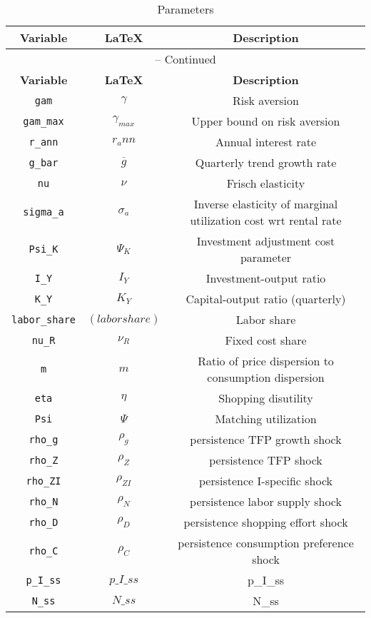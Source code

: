 \begin{center}
\begin{longtable}{ccc}
\caption{Parameters}\\%
\hline%
\multicolumn{1}{c}{\textbf{Variable}} &
\multicolumn{1}{c}{\textbf{\LaTeX}} &
\multicolumn{1}{c}{\textbf{Description}}\\%
\hline\hline%
\endfirsthead
\multicolumn{3}{c}{{\tablename} \thetable{} -- Continued}\\%
\hline%
\multicolumn{1}{c}{\textbf{Variable}} &
\multicolumn{1}{c}{\textbf{\LaTeX}} &
\multicolumn{1}{c}{\textbf{Description}}\\%
\hline\hline%
\endhead
\texttt{gam} & ${\gamma}$ & Risk aversion\\
\texttt{gam\_max} & ${\gamma_{max}}$ & Upper bound on risk aversion\\
\texttt{r\_ann} & ${r_ann}$ & Annual interest rate\\
\texttt{g\_bar} & ${\overline{g}}$ & Quarterly trend growth rate\\
\texttt{nu} & $\nu$ & Frisch elasticity\\
\texttt{sigma\_a} & ${\sigma_a}$ & Inverse elasticity of marginal utilization cost wrt rental rate\\
\texttt{Psi\_K} & ${\Psi_K}$ & Investment adjustment cost parameter\\
\texttt{I\_Y} & ${I_Y}$ & Investment-output ratio\\
\texttt{K\_Y} & ${K_Y}$ & Capital-output ratio (quarterly)\\
\texttt{labor\_share} & $(labor share)$ & Labor share\\
\texttt{nu\_R} & ${\nu_R}$ & Fixed cost share\\
\texttt{m} & ${m}$ & Ratio of price dispersion to consumption dispersion\\
\texttt{eta} & ${\eta}$ & Shopping disutility\\
\texttt{Psi} & ${\Psi}$ & Matching utilization\\
\texttt{rho\_g} & ${\rho_g}$ & persistence TFP growth shock\\
\texttt{rho\_Z} & ${\rho_Z}$ & persistence TFP shock\\
\texttt{rho\_ZI} & ${\rho_{ZI}}$ & persistence I-specific shock\\
\texttt{rho\_N} & ${\rho_N}$ & persistence labor supply shock\\
\texttt{rho\_D} & ${\rho_D}$ & persistence shopping effort shock\\
\texttt{rho\_C} & ${\rho_C}$ & persistence consumption preference shock\\
\texttt{p\_I\_ss} & $p\_I\_ss$ & p\_I\_ss\\
\texttt{N\_ss} & $N\_ss$ & N\_ss\\
\hline%
\end{longtable}
\end{center}

